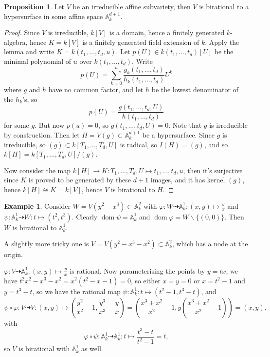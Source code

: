 \documentclass{article}
\newcommand{\A}{\mathbb{A}}
\newcommand{\dom}{\operatorname{dom}}
\theoremstyle{definition}
\newtheorem{prop}[defn]{Proposition}
\newtheorem{example}[defn]{Example}
\begin{document}
\begin{prop}
\label{prop:irraffvarisbirtohypsurf}
Let $V$ be an irreducible affine subvariety, then $V$ is birational to a hypersurface in some affine space $\A_k^{d+1}$.
\end{prop}
\begin{proof}
Since $V$ is irreducible, $k[V]$ is a domain, hence a finitely generated $k$-algebra, hence $K=k[V]$ is a finitely generated field extension of $k$. Apply the lemma and write $K=k(t_1,\ldots,t_d,u)$. Let $p(U)\in k(t_1,\ldots,t_d)[U]$ be the minimal polynomial of $u$ over $k(t_1,\ldots,t_d)$. Write
\[
p(U)=\sum_{k=0}^n \frac{g_k(t_1,\ldots,t_d)}{h_k(t_1,\ldots,t_d)}U^k
\]
where $g$ and $h$ have no common factor, and let $h$ be the lowest denominator of the $h_k$'s, so
\[
p(U)=\frac{g(t_1,\ldots,t_d,U)}{h(t_1,\ldots,t_d)}
\]
for some $g$. But now $p(u)=0$, so $g(t_1,\ldots,t_d,U)=0$. Note that $g$ is irreducible by construction. Then let $H=V(g)\subset\A_k^{d+1}$ be a hypersurface. Since $g$ is irreducible, so $(g)\subset k[T_1,\ldots,T_d,U]$ is radical, so $I(H)=(g)$, and so $k[H]=k[T_1,\ldots,T_d,U]/(g)$.

Now consider the map $k[H]\rightarrow K:T_1,\ldots,T_d,U\mapsto t_1,\ldots,t_d,u$, then it's surjective since $K$ is proved to be generated by these $d+1$ images, and it has kernel $(g)$, hence $k[H]\cong K=k[V]$, hence $V$ is birational to $H$.
\end{proof}

\begin{example}
Consider $W=V(y^2-x^3)\subset\A_k^2$ with $\varphi:W\dashrightarrow\A_k^1:(x,y)\mapsto \frac{y}{x}$ and $\psi:\A_k^1\dashrightarrow W:t\mapsto (t^2,t^3)$. Clearly $\dom\psi=\A_k^1$ and $\dom\varphi=W\backslash\{(0,0)\}$. Then $W$ is birational to $\A_k^1$.

A slightly more tricky one is $V=V(y^2-x^3-x^2)\subset\A_k^2$, which has a node at the origin.

\begin{center}
\end{center}

$\varphi:V\dashrightarrow\A_k^1:(x,y)\mapsto\frac{y}{x}$ is rational. Now parameterising the points by $y=tx$, we have $t^2x^2-x^3-x^2=x^2(t^2-x-1)=0$, so either $x=y=0$ or $x=t^2-1$ and $y=t^3-t$, so we have the rational map $\psi:\A_k^1:t\mapsto (t^2-1,t^3-t)$, and
\[
\psi\circ\varphi:V\dashrightarrow V:(x,y)\mapsto\left(\frac{y^2}{x^2}-1,\frac{y^3}{x^3}-\frac{y}{x}\right)=\left(\frac{x^3+x^2}{x^2}-1,y\left(\frac{x^3+x^2}{x^2}-1\right)\right)=(x,y),
\]
with
\[
\varphi\circ\psi:\A_k^1\dashrightarrow\A_k^1:t\mapsto\frac{t^3-t}{t^2-1}=t,
\]
so $V$ is birational with $\A_k^1$ as well.
\end{example}
\end{document}

